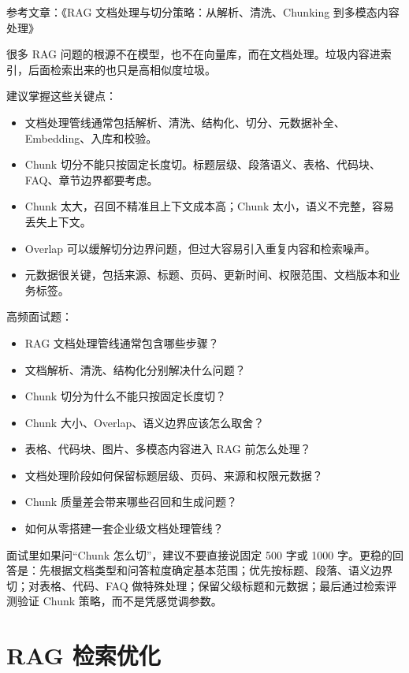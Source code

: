 \documentclass[9pt,a4paper,twocolumn]{ctexart}
\begin{document}
参考文章：《RAG 文档处理与切分策略：从解析、清洗、Chunking 到多模态内容处理》



很多 RAG 问题的根源不在模型，也不在向量库，而在文档处理。垃圾内容进索引，后面检索出来的也只是高相似度垃圾。



建议掌握这些关键点：


\begin{itemize}[itemsep=1pt, topsep=2pt]
  \item 文档处理管线通常包括解析、清洗、结构化、切分、元数据补全、Embedding、入库和校验。
  \item Chunk 切分不能只按固定长度切。标题层级、段落语义、表格、代码块、FAQ、章节边界都要考虑。
  \item Chunk 太大，召回不精准且上下文成本高；Chunk 太小，语义不完整，容易丢失上下文。
  \item Overlap 可以缓解切分边界问题，但过大容易引入重复内容和检索噪声。
  \item 元数据很关键，包括来源、标题、页码、更新时间、权限范围、文档版本和业务标签。
\end{itemize}


高频面试题：


\begin{itemize}[itemsep=1pt, topsep=2pt]
  \item RAG 文档处理管线通常包含哪些步骤？
  \item 文档解析、清洗、结构化分别解决什么问题？
  \item Chunk 切分为什么不能只按固定长度切？
  \item Chunk 大小、Overlap、语义边界应该怎么取舍？
  \item 表格、代码块、图片、多模态内容进入 RAG 前怎么处理？
  \item 文档处理阶段如何保留标题层级、页码、来源和权限元数据？
  \item Chunk 质量差会带来哪些召回和生成问题？
  \item 如何从零搭建一套企业级文档处理管线？
\end{itemize}


面试里如果问“Chunk 怎么切”，建议不要直接说固定 500 字或 1000 字。更稳的回答是：先根据文档类型和问答粒度确定基本范围；优先按标题、段落、语义边界切；对表格、代码、FAQ 做特殊处理；保留父级标题和元数据；最后通过检索评测验证 Chunk 策略，而不是凭感觉调参数。



\section*{RAG 检索优化}
\end{document}
